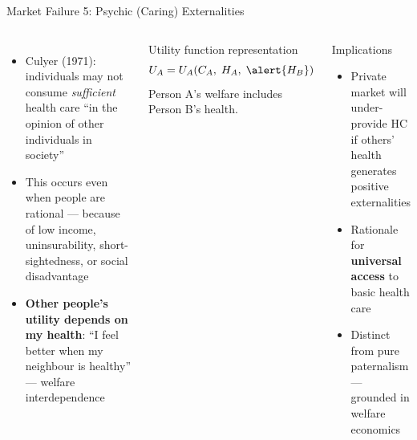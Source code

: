 \documentclass[aspectratio=169, 12pt]{beamer}
\begin{document}
\begin{frame}{Market Failure 5: Psychic (Caring) Externalities}
  \begin{columns}
      \begin{itemize}
        \item Culyer (1971): individuals may not consume \emph{sufficient} health care
              ``in the opinion of other individuals in society''
        \item This occurs even when people are rational --- because of low income,
              uninsurability, short-sightedness, or social disadvantage
        \item \textbf{Other people's utility depends on my health}: ``I feel better when
              my neighbour is healthy'' --- welfare interdependence
      \end{itemize}
      \begin{block}{Utility function representation}
        $$U_A = U_A(C_A,\; H_A,\; \alert{H_B})$$
        Person A's welfare includes Person B's health.
      \end{block}
      \begin{alertblock}{Implications}
        \begin{itemize}
          \item Private market will under-provide HC if others' health generates positive
                externalities
          \item Rationale for \textbf{universal access} to basic health care
          \item Distinct from pure paternalism --- grounded in welfare economics
        \end{itemize}
      \end{alertblock}
  \end{columns}
\end{frame}
\end{document}
